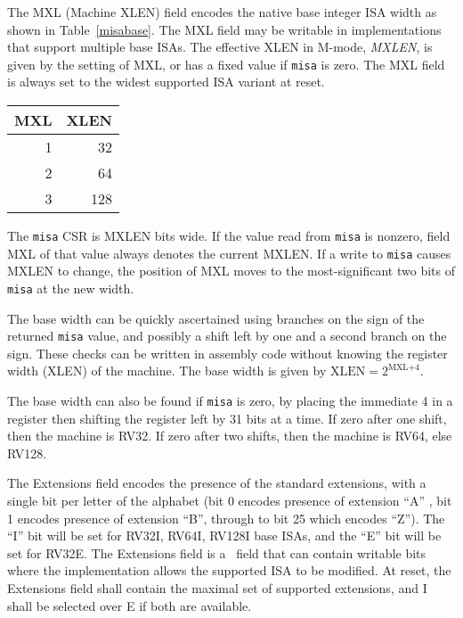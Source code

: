 The MXL (Machine XLEN) field encodes the native base integer ISA width
as shown in Table~\ref{misabase}.  The MXL field may be writable in
implementations that support multiple base ISAs.  The effective
XLEN in M-mode, {\em MXLEN}, is given by the setting of MXL, or has a
fixed value if {\tt misa} is zero.  The MXL field is always set to the
widest supported ISA variant at reset.

\begin{table*}[h!]
\begin{center}
\begin{tabular}{|r|r|}
\hline
MXL  & XLEN \\
\hline
1   & 32 \\
2   & 64 \\
3   & 128 \\
\hline
\end{tabular}
\end{center}
\caption{Encoding of MXL field in {\tt misa}}
\label{misabase}
\end{table*}

The {\tt misa} CSR is MXLEN bits wide.  If the value read from {\tt misa} is
nonzero, field MXL of that value always denotes the current MXLEN. If a write
to {\tt misa} causes MXLEN to change, the position of MXL moves to the
most-significant two bits of {\tt misa} at the new width.

\begin{commentary}
The base width can be quickly ascertained using branches on the sign
of the returned {\tt misa} value, and possibly a shift left by one and
a second branch on the sign.  These checks can be written in assembly
code without knowing the register width (XLEN) of the machine.  The
base width is given by $\mbox{XLEN}=2^{\mbox{MXL+4}}$.

The base width can also be found if {\tt misa} is zero, by placing the
immediate 4 in a register then shifting the register left by 31 bits
at a time.  If zero after one shift, then the machine is RV32.  If
zero after two shifts, then the machine is RV64, else RV128.
\end{commentary}

The Extensions field encodes the presence of the standard extensions,
with a single bit per letter of the alphabet (bit 0 encodes presence
of extension ``A'' , bit 1 encodes presence of extension ``B'',
through to bit 25 which encodes ``Z'').  The ``I'' bit will be set for
RV32I, RV64I, RV128I base ISAs, and the ``E'' bit will be set for
RV32E.  The Extensions field is a \warl\ field that can contain writable bits
where the implementation allows the supported ISA to be modified.  At
reset, the Extensions field shall contain the maximal set of supported
extensions, and I shall be selected over E if both are available.

